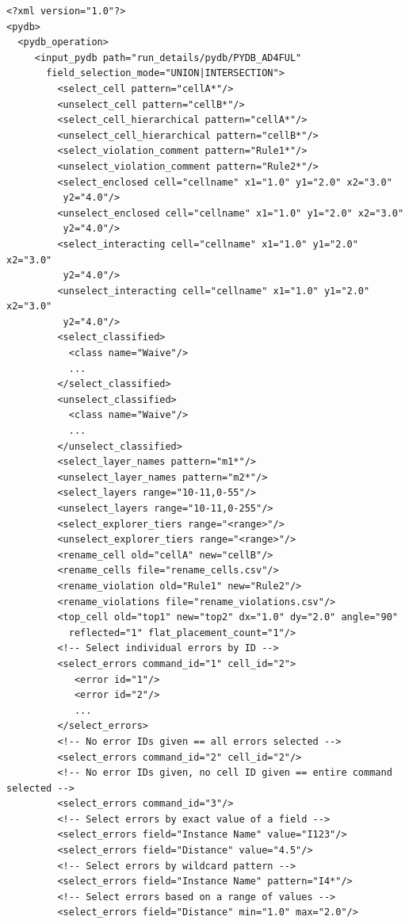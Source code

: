 \begin{lstlisting}[style=shell,caption={XML 命令文件语法},label={ex:xml-cmd-syntax}]
<?xml version="1.0"?>
<pydb>
  <pydb_operation>
     <input_pydb path="run_details/pydb/PYDB_AD4FUL"
       field_selection_mode="UNION|INTERSECTION">
         <select_cell pattern="cellA*"/>
         <unselect_cell pattern="cellB*"/>
         <select_cell_hierarchical pattern="cellA*"/>
         <unselect_cell_hierarchical pattern="cellB*"/>
         <select_violation_comment pattern="Rule1*"/>
         <unselect_violation_comment pattern="Rule2*"/>
         <select_enclosed cell="cellname" x1="1.0" y1="2.0" x2="3.0"
          y2="4.0"/>
         <unselect_enclosed cell="cellname" x1="1.0" y1="2.0" x2="3.0"
          y2="4.0"/>
         <select_interacting cell="cellname" x1="1.0" y1="2.0" x2="3.0"
          y2="4.0"/>
         <unselect_interacting cell="cellname" x1="1.0" y1="2.0" x2="3.0"
          y2="4.0"/>
         <select_classified>
           <class name="Waive"/>
           ...
         </select_classified>
         <unselect_classified>
           <class name="Waive"/>
           ...
         </unselect_classified>
         <select_layer_names pattern="m1*"/>
         <unselect_layer_names pattern="m2*"/>
         <select_layers range="10-11,0-55"/>
         <unselect_layers range="10-11,0-255"/>
         <select_explorer_tiers range="<range>"/>
         <unselect_explorer_tiers range="<range>"/>
         <rename_cell old="cellA" new="cellB"/>
         <rename_cells file="rename_cells.csv"/>
         <rename_violation old="Rule1" new="Rule2"/>
         <rename_violations file="rename_violations.csv"/>
         <top_cell old="top1" new="top2" dx="1.0" dy="2.0" angle="90"
           reflected="1" flat_placement_count="1"/>
         <!-- Select individual errors by ID -->
         <select_errors command_id="1" cell_id="2">
            <error id="1"/>
            <error id="2"/>
            ...
         </select_errors>
         <!-- No error IDs given == all errors selected -->
         <select_errors command_id="2" cell_id="2"/>
         <!-- No error IDs given, no cell ID given == entire command selected -->
         <select_errors command_id="3"/>
         <!-- Select errors by exact value of a field -->
         <select_errors field="Instance Name" value="I123"/>
         <select_errors field="Distance" value="4.5"/>
         <!-- Select errors by wildcard pattern -->
         <select_errors field="Instance Name" pattern="I4*"/>
         <!-- Select errors based on a range of values -->
         <select_errors field="Distance" min="1.0" max="2.0"/>

\end{lstlisting}
